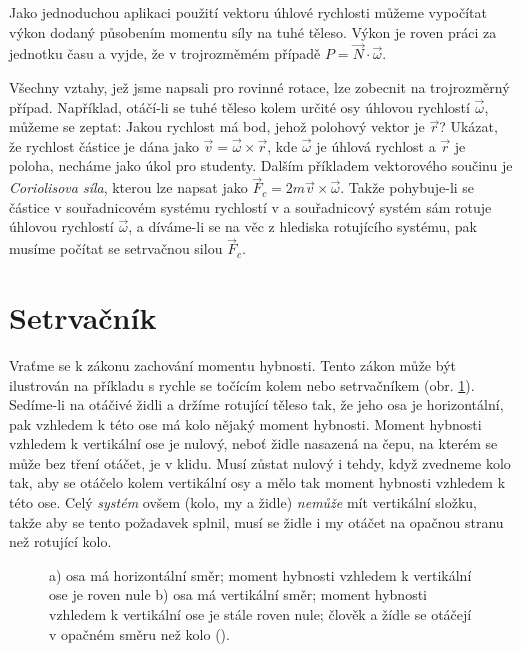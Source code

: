     Jako jednoduchou aplikaci použití vektoru úhlové rychlosti můžeme vypočítat výkon dodaný
    působením momentu síly na tuhé těleso. Výkon je roven práci za jednotku času a vyjde, že v
    trojrozměmém případě \(P=\vec{N}\cdot\vec{\omega}\).

    Všechny vztahy, jež jsme napsali pro rovinné rotace, lze zobecnit na trojrozměrný případ.
    Například, otáčí-li se tuhé těleso kolem určité osy úhlovou rychlostí \(\vec{\omega}\), můžeme
    se zeptat: Jakou rychlost má bod, jehož polohový vektor je \(\vec{r}\)? Ukázat, že rychlost
    částice je dána jako \(\vec{v} = \vec{\omega} \times \vec{r}\), kde \(\vec{\omega}\) je úhlová
    rychlost a \(\vec{r}\) je poloha, necháme jako úkol pro studenty. Dalším příkladem vektorového
    součinu je \emph{Coriolisova síla}, kterou lze napsat jako \(\vec{F}_c =2m\vec{v} \times
    \vec{\omega}\). Takže pohybuje-li se částice v souřadnicovém systému rychlostí v a souřadnicový
    systém sám rotuje úhlovou rychlostí \(\vec{\omega}\), a díváme-li se na věc z hlediska
    rotujícího systému, pak musíme počítat se setrvačnou silou \(\vec{F}_c\).

  \section{Setrvačník}\label{fyz:IchapXXsecIII}
    Vraťme se k zákonu zachování momentu hybnosti. Tento zákon může být ilustrován na příkladu s
    rychle se točícím kolem nebo setrvačníkem (obr. \ref{fyz:fig0406}). Sedíme-li na otáčivé židli a
    držíme rotující těleso tak, že jeho osa je horizontální, pak vzhledem k této ose má kolo nějaký
    moment hybnosti. Moment hybnosti vzhledem k vertikální ose je nulový, neboť židle nasazená na
    čepu, na kterém se může bez tření otáčet, je v klidu. Musí zůstat nulový i tehdy, když zvedneme
    kolo tak, aby se otáčelo kolem vertikální osy a mělo tak moment hybnosti vzhledem k této ose.
    Celý \emph{systém} ovšem (kolo, my a židle) \emph{nemůže} mít vertikální složku, takže aby se
    tento požadavek splnil, musí se židle i my otáčet na opačnou stranu než rotující kolo.

    \begin{figure}[ht!] %
      \centering
      \hspace{5em}
      \caption{a) osa má horizontální směr; moment hybnosti vzhledem k vertikální ose je roven nule 
              b) osa má vertikální směr; moment hybnosti vzhledem k vertikální ose je stále roven 
              nule; člověk a žídle se otáčejí v opačném směru než kolo
              (\cite[s.~278]{Feynman01}).}
      \label{fyz:fig0406}
    \end{figure}

